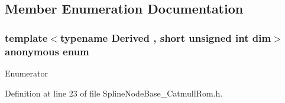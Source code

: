 \subsection{Member Enumeration Documentation}
\hypertarget{classmodel_1_1_spline_node_base_3_01_derived_00_01dim_00_011_00_01_catmull_rom_01_4_ab13da9c673efb528b32f27cce59e9b90}{}\subsubsection[{anonymous enum}]{\setlength{\rightskip}{0pt plus 5cm}template$<$typename Derived , short unsigned int dim$>$ anonymous enum}\label{classmodel_1_1_spline_node_base_3_01_derived_00_01dim_00_011_00_01_catmull_rom_01_4_ab13da9c673efb528b32f27cce59e9b90}
\begin{Desc}
\item[Enumerator]\par
\begin{description}
\item[{\em 
\hypertarget{classmodel_1_1_spline_node_base_3_01_derived_00_01dim_00_011_00_01_catmull_rom_01_4_ab13da9c673efb528b32f27cce59e9b90af0273aaa3354d1dcfbfb6c727a3379b3}{}corder\label{classmodel_1_1_spline_node_base_3_01_derived_00_01dim_00_011_00_01_catmull_rom_01_4_ab13da9c673efb528b32f27cce59e9b90af0273aaa3354d1dcfbfb6c727a3379b3}
}]\end{description}
\end{Desc}


Definition at line 23 of file Spline\+Node\+Base\+\_\+\+Catmull\+Rom.\+h.

